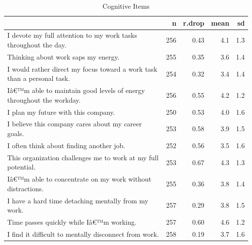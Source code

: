 \documentclass[
]{book}
\begin{document}
\begin{table}

\caption{\label{tab:rdrop3}Cognitive Items}
\centering
\begin{tabular}[t]{l|r|r|r|r}
\hline
  & n & r.drop & mean & sd\\
\hline
I devote my full attention to my work tasks throughout the day. & 256 & 0.43 & 4.1 & 1.3\\
\hline
Thinking about work saps my energy. & 255 & 0.35 & 3.6 & 1.4\\
\hline
I would rather direct my focus toward a work task than a personal task. & 254 & 0.32 & 3.4 & 1.4\\
\hline
Iâ€™m able to maintain good levels of energy throughout the workday. & 256 & 0.55 & 4.2 & 1.2\\
\hline
I plan my future with this company. & 250 & 0.53 & 4.0 & 1.6\\
\hline
I believe this company cares about my career goals. & 253 & 0.58 & 3.9 & 1.5\\
\hline
I often think about finding another job. & 252 & 0.56 & 3.5 & 1.6\\
\hline
This organization challenges me to work at my full potential. & 253 & 0.67 & 4.3 & 1.3\\
\hline
Iâ€™m able to concentrate on my work without distractions. & 255 & 0.36 & 3.8 & 1.4\\
\hline
I have a hard time detaching mentally from my work. & 257 & 0.29 & 3.8 & 1.5\\
\hline
Time passes quickly while Iâ€™m working. & 257 & 0.60 & 4.6 & 1.2\\
\hline
I find it difficult to mentally disconnect from work. & 258 & 0.19 & 3.7 & 1.6\\
\hline
\end{tabular}
\end{table}
\end{document}
